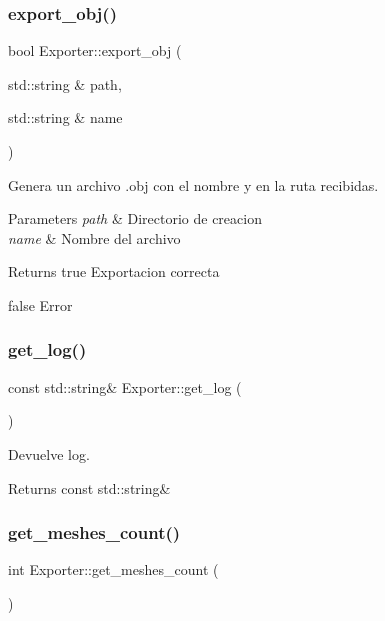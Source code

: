 \subsubsection{\texorpdfstring{export\_obj()}{export\_obj()}}
{\footnotesize\ttfamily bool Exporter\+::export\+\_\+obj (\begin{DoxyParamCaption}\item[{std\+::string \&}]{path,  }\item[{std\+::string \&}]{name }\end{DoxyParamCaption})}



Genera un archivo .obj con el nombre y en la ruta recibidas. 


\begin{DoxyParams}{Parameters}
{\em path} & Directorio de creacion \\
\hline
{\em name} & Nombre del archivo \\
\hline
\end{DoxyParams}
\begin{DoxyReturn}{Returns}
true Exportacion correcta 

false Error 
\end{DoxyReturn}
\mbox{\label{class_exporter_a46b7cd63af64656de8a9ab0b36b52d6f}} 
\subsubsection{\texorpdfstring{get\_log()}{get\_log()}}
{\footnotesize\ttfamily const std\+::string\& Exporter\+::get\+\_\+log (\begin{DoxyParamCaption}{ }\end{DoxyParamCaption})\hspace{0.3cm}{\ttfamily [inline]}}



Devuelve log. 

\begin{DoxyReturn}{Returns}
const std\+::string\& 
\end{DoxyReturn}
\mbox{\label{class_exporter_a3e6552a8e20d64bc630cebd74c1f58f7}} 
\subsubsection{\texorpdfstring{get\_meshes\_count()}{get\_meshes\_count()}}
{\footnotesize\ttfamily int Exporter\+::get\+\_\+meshes\+\_\+count (\begin{DoxyParamCaption}{ }\end{DoxyParamCaption})\hspace{0.3cm}{\ttfamily [inline]}}



